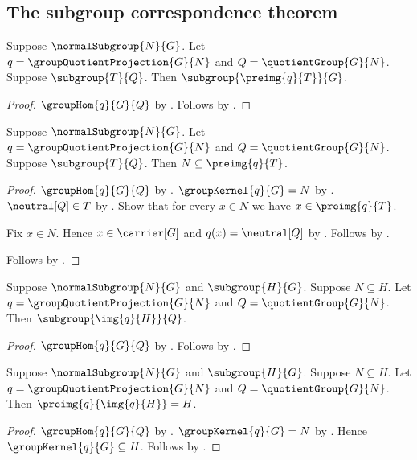 \subsection{The subgroup correspondence theorem}

\begin{theorem}\label{group_quotient_correspondence_preimage_subgroup}
    Suppose $\normalSubgroup{N}{G}$.
    Let $q=\groupQuotientProjection{G}{N}$ and
        $Q=\quotientGroup{G}{N}$.
    Suppose $\subgroup{T}{Q}$.
    Then $\subgroup{\preimg{q}{T}}{G}$.
\end{theorem}
\begin{proof}
    $\groupHom{q}{G}{Q}$ by
        .
    Follows by .
\end{proof}

\begin{theorem}\label{group_quotient_correspondence_preimage_contains_kernel}
    Suppose $\normalSubgroup{N}{G}$.
    Let $q=\groupQuotientProjection{G}{N}$ and
        $Q=\quotientGroup{G}{N}$.
    Suppose $\subgroup{T}{Q}$.
    Then $N\subseteq\preimg{q}{T}$.
\end{theorem}
\begin{proof}
    $\groupHom{q}{G}{Q}$ by
        .
    $\groupKernel{q}{G}=N$ by
        .
    $\neutral[Q]\in T$ by .
    Show that for every $x\in N$ we have $x\in\preimg{q}{T}$.
    \begin{subproof}
        Fix $x\in N$.
        Hence $x\in\carrier[G]$ and $q(x)=\neutral[Q]$ by
            .
        Follows by .
    \end{subproof}
    Follows by .
\end{proof}

\begin{theorem}\label{group_quotient_correspondence_image_subgroup}
    Suppose $\normalSubgroup{N}{G}$ and $\subgroup{H}{G}$.
    Suppose $N\subseteq H$.
    Let $q=\groupQuotientProjection{G}{N}$ and
        $Q=\quotientGroup{G}{N}$.
    Then $\subgroup{\img{q}{H}}{Q}$.
\end{theorem}
\begin{proof}
    $\groupHom{q}{G}{Q}$ by
        .
    Follows by .
\end{proof}

\begin{theorem}\label{group_quotient_correspondence_preimage_image}
    Suppose $\normalSubgroup{N}{G}$ and $\subgroup{H}{G}$.
    Suppose $N\subseteq H$.
    Let $q=\groupQuotientProjection{G}{N}$ and
        $Q=\quotientGroup{G}{N}$.
    Then $\preimg{q}{\img{q}{H}}=H$.
\end{theorem}
\begin{proof}
    $\groupHom{q}{G}{Q}$ by
        .
    $\groupKernel{q}{G}=N$ by
        .
    Hence $\groupKernel{q}{G}\subseteq H$.
    Follows by .
\end{proof}


